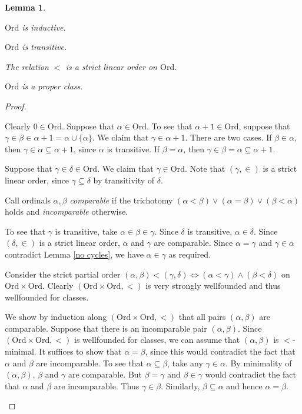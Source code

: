 \documentclass[a4paper, 11pt]{amsart}
\newtheorem{lemma}[lemma]{Lemma}
\theoremstyle{remark}
\newcommand{\Ord}{\mathrm{Ord}}
\newenvironment{enumerate-(1)}{\begin{enumerate}[label={\upshape (\arabic*)}, leftmargin=2pc]}{\end{enumerate}}
\begin{document}
\begin{lemma} \ 
\label{properties of Ord} 
\begin{enumerate-(1)} 
\item 
$\Ord$ is inductive. 
\item 
$\Ord$ is transitive. 
\item 
The relation $<$ is a strict linear order on $\Ord$. 
\item 
$\Ord$ is a proper class. 
\end{enumerate-(1)} 
\end{lemma} 
\begin{proof} \ 
\begin{enumerate-(1)} 
\item 
Clearly $0\in \Ord$. 
Suppose that $\alpha\in \Ord$. 
To see that $\alpha+1\in \Ord$, suppose that $\gamma\in \beta\in \alpha+1=\alpha\cup \{\alpha\} $. We claim that $\gamma \in \alpha+1$. 
There are two cases. If $\beta\in \alpha$, then $\gamma\in \alpha \subseteq \alpha+1$, since $\alpha$ is transitive. 
If $\beta=\alpha$, then $\gamma\in \beta=\alpha \subseteq \alpha+1$. 


\item 
Suppose that $\gamma \in \delta \in \Ord$. 
We claim that $\gamma\in \Ord$. 
Note that $(\gamma,\in)$ is a strict linear order, since $\gamma\subseteq \delta$ by transitivity of $\delta$. 

Call ordinals $\alpha,\beta$ \emph{comparable} if the trichotomy $(\alpha<\beta) \vee (\alpha=\beta) \vee (\beta<\alpha)$ holds and \emph{incomparable} otherwise.

To see that $\gamma$ is transitive, take $\alpha \in \beta \in \gamma$. 
Since $\delta$ is transitive, $\alpha\in \delta$. 
Since $(\delta,\in)$ is a strict linear order, $\alpha$ and $\gamma$ are comparable. 
Since $\alpha=\gamma$ and $\gamma\in\alpha$ contradict Lemma \ref{no cycles}, we have $\alpha\in \gamma$ as required. 

\item 

Consider the strict partial order $(\alpha,\beta) < (\gamma,\delta) \Longleftrightarrow (\alpha<\gamma) \wedge (\beta<\delta)$ on $\Ord \times \Ord$. 
Clearly $(\Ord \times \Ord,<)$ is very strongly wellfounded and thus wellfounded for classes. 

We show by induction along $(\Ord \times \Ord,<)$ that all pairs $(\alpha,\beta)$ are comparable. 
Suppose that there is an incomparable pair $(\alpha,\beta)$. 
Since $(\Ord \times \Ord,<)$ is wellfounded for classes, we can assume that $(\alpha,\beta)$ is $<$-minimal. 
It suffices to show that $\alpha=\beta$, since this would contradict the  fact that $\alpha$ and $\beta$ are incomparable. 
To see that $\alpha\subseteq \beta$, take any $\gamma\in \alpha$. By minimality of $(\alpha,\beta)$, $\beta$ and $\gamma$ are comparable. 
But $\beta=\gamma$ and $\beta\in \gamma$ would contradict the fact that $\alpha$ and $\beta$ are incomparable. 
Thus $\gamma\in \beta$. 
Similarly, $\beta \subseteq \alpha$ and hence $\alpha=\beta$. 


\end{enumerate-(1)}
\end{proof}
\end{document}
